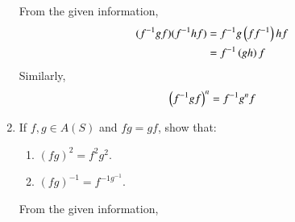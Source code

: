 \begin{enumerate}[label=\arabic*.,ref=\thesubsection.\theenumi]
\solution  From the given information, 
		\begin{align}
			(f^{-1}gf)(f^{-1}hf) &= 
			f^{-1}g\left(ff^{-1}\right)hf 
\\
			&			= 
			f^{-1}\left(gh\right)f  
		\end{align}
		Similarly,
		\begin{align}
			\left(f^{-1}gf\right)^n = 
			f^{-1}g^n  f
		\end{align}
	\item If $f, g \in A (S)$ and $fg = gf$, show that:
\begin{enumerate}
	\item  $(fg)^2 = f^2g^2$.
	\item  $(fg)^{-1} = f^{-1g^{-1}}$.
\end{enumerate}
\solution From the given information, 
\end{enumerate}

